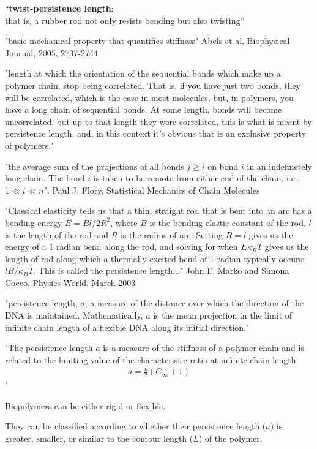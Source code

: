 ``\textbf{twist-persistence length}:\\
that is, a rubber rod not only resists bending but also twisting''

"basic mechanical property that quantifies stiffness"
Abels et al, Biophysical Journal, 2005, 2737-2744

"length at which the orientation of the sequential bonds which make
up a polymer chain, stop being correlated. That is, if you have just
two bonds, they will be correlated, which is the case in most
molecules, but, in polymers, you have a long chain of sequential
bonds. At some length, bonds will become uncorrelated, but up to that
length they were correlated, this is what is meant by persistence
length, and, in this context it's obvious that is an exclusive
property of polymers."

"the average sum of the projections of all bonds $ j \geq i$  on bond
$i$ in an indefinetely long chain. The bond $i$ is taken to be remote
from either end of the chain, i.e., $1 \ll i \ll n$". Paul J. Flory,
Statistical Mechanics of Chain Molecules

"Classical elasticity tells us that a thin, straight rod that is bent
into an arc has a bending energy $E=Bl/2R^2$, where $B$ is the bending
elastic constant of the rod, $l$ is the length of the rod and $R$ is
the radius of arc. Setting $R=l$ gives us the energy of a 1 radian
bend along the rod, and solving for when $E \kappa_{B}T$ gives us the
length of rod along which a thermally excited bend of 1 radian
typically occurs: $l B/\kappa_{B}T$. This is called the persistence
length..." John F. Marko and Simona Cocco, Physics World, March 2003

"persistence length, $a$, a measure of the distance over which the
direction of the DNA is maintained. Mathematically, $a$ is the mean
projection in the limit of infinite chain length of a flexible DNA
along its initial direction." \cite{olson1995}

"The persistence length $a$ is a measure of the stiffness of a polymer
chain and is related to the limiting value of the characteristic ratio
at infinite chain length
\begin{gather}
a=\frac{\nu}{2}(C_{\infty}+1)
\end{gather}
"



Biopolymers can be either rigid or flexible. 

They can be classified  according to whether their persistence length ($a$)
is greater, smaller, or similar to the contour length ($L$) of the polymer.

